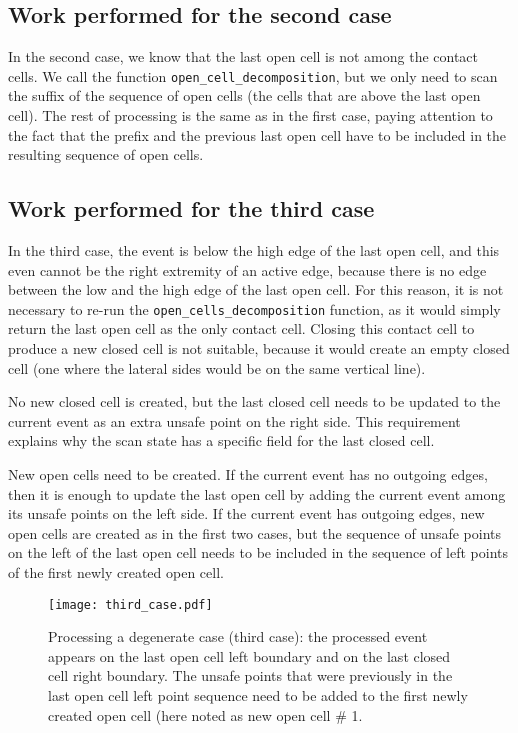 \documentclass[a4paper, USenglish, cleveref, autoref, thm-restate]{lipics-v2021}
\begin{document}
\subsection{Work performed for the second case}
In the second case, we know that the last open cell is not among the
contact cells.  We call the function {\tt open\_cell\_decomposition},
but we only need to scan the suffix of the sequence of open cells (the
cells that are above the last open cell).  The rest of processing is
the same as in the first case, paying attention to the fact that the
prefix and the previous last open cell have to be included in the
resulting sequence of open cells.

\subsection{Work performed for the third case}
In the third case, the event is below the high edge of the last open
cell, and this even cannot be the right extremity of
an active edge, because there is no edge between the low and the high
edge of the last open cell.  For this reason, it is not necessary to
re-run the {\tt open\_cells\_decomposition} function, as it would
simply return the last open cell as the only contact cell.
Closing this contact cell to produce a new closed
cell is not suitable, because it would create an empty closed cell
(one where the lateral sides would be on the same vertical line).

No new closed cell is created, but the last closed cell needs to be
updated to the current event as an extra unsafe point on the right side.
This requirement explains why the scan state has a specific field for
the last closed cell.

New open cells need to be created.  If the current event has no
outgoing edges, then it is enough to update the last open cell by adding
the current event among its unsafe points on the left side.  If the
current event has outgoing edges, new open cells are created as in the
first two cases, but the sequence of unsafe points on the left of
the last open cell needs to be included in the sequence of left
points of the first newly created open cell.
\begin{figure}
\begin{center}
\texttt{[image: third\_case.pdf]}
\end{center}
\caption{Processing a degenerate case (third case):
  the processed event appears on
  the last open cell left boundary and on the last closed cell right
  boundary.  The unsafe points that were previously in the last open
  cell left point sequence need to be added to the first newly created
  open cell (here noted as {\sf new open cell \# 1}.
  }
\end{figure}
\end{document}
